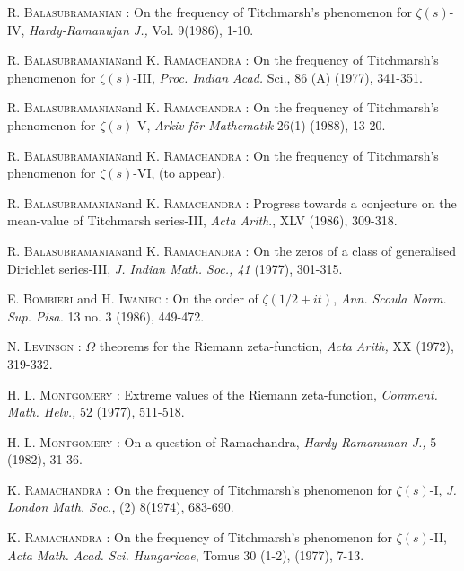 \begin{thebibliography}{99}
 \textsc{R. Balasubramanian} : On the frequency of Titchmarsh's phenomenon for $\zeta(s)$-IV, \textit{Hardy-Ramanujan J.,} Vol. 9(1986), 1-10.

 \textsc{R. Balasubramanian}\pageoriginale and \textsc{K. Ramachandra} : On the frequency of Titchmarsh's phenomenon for $\zeta(s)$-III, \textit{Proc. Indian Acad.} Sci., 86 (A) (1977), 341-351.

 \textsc{R. Balasubramanian}\pageoriginale and \textsc{K. Ramachandra} : On the frequency of Titchmarsh's phenomenon for $\zeta(s)$-V, \textit{Arkiv f\"or Mathematik} 26(1) (1988), 13-20.

 \textsc{R. Balasubramanian}\pageoriginale and \textsc{K. Ramachandra} : On the frequency of Titchmarsh's phenomenon for $\zeta(s)$-VI, (to appear).

 \textsc{R. Balasubramanian}\pageoriginale and \textsc{K. Ramachandra} : Progress towards a conjecture on the mean-value of Titchmarsh series-III, \textit{Acta Arith}., XLV (1986), 309-318.

 \textsc{R. Balasubramanian}\pageoriginale and \textsc{K. Ramachandra} : On the zeros of a class of generalised Dirichlet series-III, \textit{J. Indian Math. Soc., 41} (1977), 301-315.

 \textsc{E. Bombieri} and \textsc{H. Iwaniec} : On the order of $\zeta(1/2+it)$, \textit{Ann. Scoula Norm. Sup. Pisa.} 13 no. 3 (1986), 449-472.

 \textsc{N. Levinson} : $\Omega$ theorems for the Riemann zeta-function, \textit{Acta Arith,} XX (1972), 319-332.

 \textsc{H. L. Montgomery} : Extreme values of the Riemann zeta-function, \textit{Comment. Math. Helv.,} 52 (1977), 511-518.

 \textsc{H. L. Montgomery} : On a question of Ramachandra, \textit{Hardy-Ramanunan J.,} 5 (1982), 31-36.

 \textsc{K. Ramachandra} : On the frequency of Titchmarsh's phenomenon for $\zeta(s)$-I, \textit{J. London Math. Soc.,} (2) 8(1974), 683-690.

 \textsc{K. Ramachandra} : On the frequency of Titchmarsh's phenomenon for $\zeta(s)$-II, \textit{Acta Math. Acad. Sci. Hungaricae}, Tomus 30 (1-2), (1977), 7-13.


\end{thebibliography}
